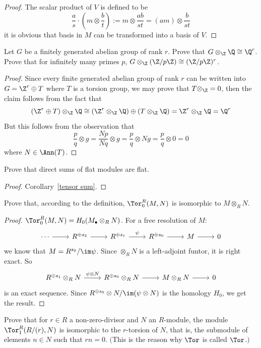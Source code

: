 \begin{proof}
The scalar product of $V$ is defined to be
\[\dfrac{a}{s}\cdot(m\otimes\dfrac{b}{t}):=m\otimes\dfrac{ab}{st}=(am)\otimes\dfrac{b}{st}\]
it is obvious that basis in $M$ can be transformed into a basis of $V$.
\end{proof}
\begin{exercise}
Let $G$ be a finitely generated abelian group of rank $r$. Prove that $G\otimes_{\Z}\Q\cong\Q^r$.
Prove that for infinitely many primes $p$, $G\otimes_{\Z}(\Z/p\Z)\cong(\Z/p\Z)^r$.
\end{exercise}
\begin{proof}
Since every finite generated abelian group of rank $r$ can be written into $G=\Z^r\oplus T$ where $T$ is a torsion group, we may prove that $T\otimes_{\Z}=0$, then the claim follows from the fact that
\[(\Z^r\oplus T)\otimes_{\Z}\Q\cong (\Z^r\otimes_{\Z}\Q)\oplus(T\otimes_{\Z}\Q)=\Z^r\otimes_{\Z}\Q=\Q^r\]
But this follows from the observation that
\[\dfrac{p}{q}\otimes g=\dfrac{Np}{Nq}\otimes g=\dfrac{p}{q}\otimes Ng=\dfrac{p}{q}\otimes 0=0\]
where $N\in\Ann(T)$.
\end{proof}
\begin{exercise}
Prove that direct sums of flat modules are flat.
\end{exercise}
\begin{proof}
Corollary~\ref{tensor sum}.
\end{proof}
\begin{exercise}
Prove that, according to the definition, $\Tor^R_0(M,N)$ is isomorphic to $M\otimes_RN$.
\end{exercise}
\begin{proof}
$\Tor^R_0(M,N)=H_0(M_{\bullet}\otimes_{R}N)$. For a free resolution of $M$:
\[\begin{tikzcd}
\cdots\ar[r]&R^{\oplus s_2}\ar[r]&R^{\oplus s_1}\ar[r,"\psi"]&R^{\oplus s_0}\ar[r]&M\ar[r]&0
\end{tikzcd}\]
we know that $M=R^{s_0}/\im\psi$. Since $\otimes_{R}N$ is a left-adjoint funtor, it is right exact. So
\[\begin{tikzcd}
R^{\oplus s_1}\otimes_{R}N\ar[r,"\psi\otimes N"]&R^{\oplus s_0}\otimes_{R}N\ar[r]&M\otimes_{R}N\ar[r]&0
\end{tikzcd}\]
is an exact sequence. Since $R^{\oplus s_0}\otimes N/\im(\psi\otimes N)$ is the homology $H_0$, we get the result.
\end{proof}
\begin{exercise}\label{Tor(R/(r),M)}
Prove that for $r\in R$ a non-zero-divisor and $N$ an $R$-module, the module $\Tor^R_1(R/(r),N)$ is isomorphic to the $r$-torsion of $N$, that is, the submodule of elements $n\in N$ such that $rn=0$. $($This is the reason why $\Tor$ is called $\Tor$.$)$
\end{exercise}
